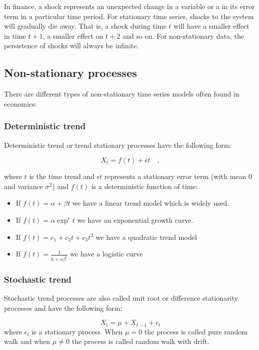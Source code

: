 In finance, a shock represents an unexpected change in a variable or a in its
error term in a particular time period. For stationary time series, shocks to
the system will gradually die away. That is, a shock during time $t$ will have a
smaller effect in time $t+1$, a smaller effect on $t+2$ and so on. For
non-stationary data, the persistence of shocks will always be infinite. 

\subsection{Non-stationary processes}

There are different types of non-stationary time series models often found in economics:


\subsubsection{Deterministic trend}

Deterministic trend or trend stationary processes have the following form:

\[
X_t = f(t) + \epsilon{t} \quad ,
\]

\noindent where $t$ is the time trend and $\epsilon{t}$ represents a stationary error term (with mean 0 and variance $\sigma^2$) and $f(t)$ is a deterministic function of time:
\begin{itemize}
\item If $f(t) = \alpha + \beta t$ we have a linear trend model which is widely used. 
\item If $f(t)= \alpha \exp^rt$ we have an exponential growth curve.
\item If $f(t) = c_1 + c_2t + c_3 t^2$ we have a quadratic trend model
\item If $f(t) = \frac{1}{k+\alpha \beta ^t }$ we have a logistic curve
\end{itemize}

\subsubsection{Stochastic trend}
Stochastic trend processes are also called unit root or difference stationarity processes and have the following form:

\[
X_t = \mu + X_{t-1} + \epsilon_t
\]
\noindent where $\epsilon_t$ is a stationary process. When $\mu = 0 $ the process is called pure random walk and when $\mu \neq 0$  the process is called random walk with drift.

